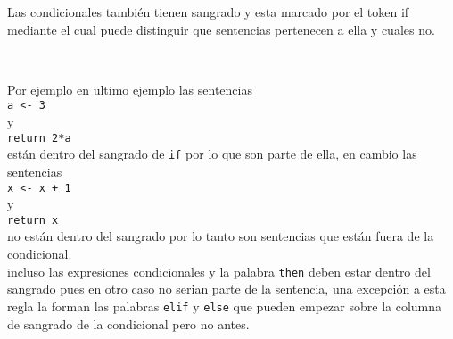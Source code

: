       Las condicionales también tienen sangrado y esta marcado por el token if mediante el cual puede distinguir que sentencias pertenecen a ella y cuales no.
      
      \begin{fxcode}
         \\
      \end{fxcode}
      
      Por ejemplo en ultimo ejemplo las sentencias\\
      \texttt{a~<- 3}\\
      y\\
      \texttt{return 2*a}\\ 
      están dentro del sangrado de \texttt{if} por lo que son parte de ella,
      en cambio las sentencias\\
      \texttt{x~<- x + 1}\\
      y\\
      \texttt{return x}\\
      no están dentro del sangrado por lo tanto son sentencias que están fuera de la condicional.
      \\
      
      incluso las expresiones condicionales y la palabra \texttt{then} deben estar dentro del sangrado pues en otro caso no serian parte de la sentencia, una excepción a esta regla la forman las palabras \texttt{elif} y \texttt{else} que pueden empezar sobre la columna de sangrado de la condicional pero no antes.
      
      \begin{fxcode}
         \\
         \\
         \\
         \\
         \\
         \\
         \\
         \\
         \\    
         \\
         \\
         \\
      \end{fxcode}
      
